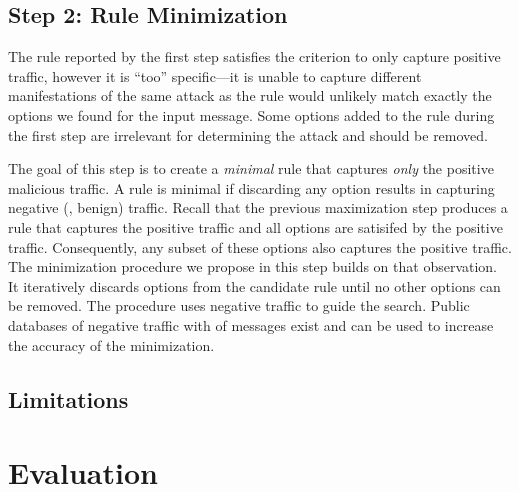 \documentclass[runningheads]{llncs}
\begin{document}
\subsection{Step 2: Rule Minimization}

The rule reported by the first step satisfies the criterion to only
capture positive traffic, however it is ``too'' specific---it is
unable to capture different manifestations of the same attack as the
rule would unlikely match exactly the options we found for the input
message. Some options added to the rule during the first step are
irrelevant for determining the attack and should be removed.

The goal of this step is to create a \emph{minimal} rule that captures
\emph{only} the positive malicious traffic. A rule is minimal if
discarding any option results in capturing negative (\ie{}, benign)
traffic. Recall that the previous maximization step produces a rule
that captures the positive traffic and all options are satisifed by
the positive traffic. Consequently, any subset of these options also
captures the positive traffic. The minimization procedure we propose
in this step builds on that observation. It iteratively discards
options from the candidate rule until no other options can be
removed. The procedure uses negative traffic to guide the
search. Public databases of negative traffic with  of
messages exist  and can be used to increase the
accuracy of the minimization.

\subsection{Limitations}


\section{Evaluation}


\end{document}
